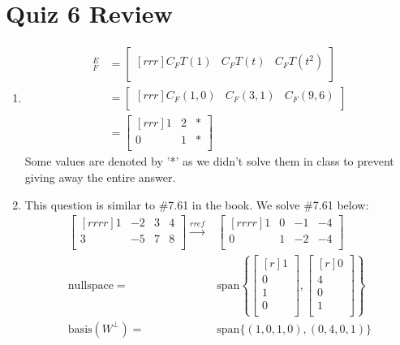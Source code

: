 \documentclass{report}
\theoremstyle{plain}
\theoremstyle{definition}
\theoremstyle{plain}
\begin{document}
\section{Quiz 6 Review}
\begin{enumerate}
\item
\begin{align*}
[T]_F^E&=\begin{bmatrix}[rrr]C_FT(1)&C_FT(t)&C_FT(t^2)\\\end{bmatrix}\\
&=\begin{bmatrix}[rrr]C_F(1,0)&C_F(3,1)&C_F(9,6)\\\end{bmatrix}\\
&=\begin{bmatrix}[rrr]1&2&*\\0&1&*\\\end{bmatrix}
\end{align*}
Some values are denoted by '*' as we didn't solve them in class to prevent giving away the entire answer.

\item This question is similar to \#7.61 in the book. We solve \#7.61 below: 
\begin{align*}
\begin{bmatrix}[rrrr]1&-2&3&4\\3&-5&7&8\\\end{bmatrix} \xrightarrow[]{rref}& \begin{bmatrix}[rrrr]1&0&-1&-4\\0&1&-2&-4\\\end{bmatrix}\\
\mathrm{nullspace}=&\mathrm{span}\left\{\begin{bmatrix}[r]1\\0\\1\\0\\\end{bmatrix},\begin{bmatrix}[r]0\\4\\0\\1\\\end{bmatrix}\right\}\\
\mathrm{basis}(W^\perp)=&\mathrm{span}\{(1,0,1,0),(0,4,0,1)\}
\end{align*}
\end{enumerate}
\end{document}
